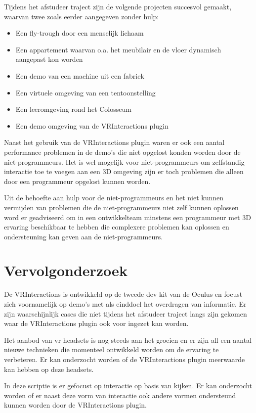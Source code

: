 Tijdens het afstudeer traject zijn de volgende projecten succesvol gemaakt, waarvan twee zoals eerder aangegeven zonder hulp:
\begin{itemize}
	\item Een fly-trough door een menselijk lichaam
	\item Een appartement waarvan o.a. het meubilair en de vloer dynamisch aangepast kon worden
	\item Een demo van een machine uit een fabriek
	\item Een virtuele omgeving van een tentoonstelling
	\item Een leeromgeving rond het Colosseum
	\item Een demo omgeving van de VRInteractions plugin
\end{itemize}

Naast het gebruik van de VRInteractions plugin waren er ook een aantal performance problemen in de demo's die niet opgelost konden worden door de niet-programmeurs. Het is wel mogelijk voor niet-programmeurs om zelfstandig interactie toe te voegen aan een 3D omgeving zijn er toch problemen die alleen door een programmeur opgelost kunnen worden.

Uit de behoefte aan hulp voor de niet-programmeurs en het niet kunnen vermijden van problemen die de niet-programmeurs niet zelf kunnen oplossen word er geadviseerd om in een ontwikkelteam minstens een programmeur met 3D ervaring beschikbaar te hebben die complexere problemen kan oplossen en ondersteuning kan geven aan de niet-programmeurs.

\section{Vervolgonderzoek}
De VRInteractions is ontwikkeld op de tweede dev kit van de Oculus en focust zich voornamelijk op demo's met als einddoel het overdragen van informatie. Er zijn waarschijnlijk cases die niet tijdens het afstudeer traject langs zijn gekomen waar de VRInteractions plugin ook voor ingezet kan worden.

Het aanbod van \gls{vr} headsets is nog steeds aan het groeien en er zijn all een aantal nieuwe technieken die momenteel ontwikkeld worden om de ervaring te verbeteren. Er kan onderzocht worden of de VRInteractions plugin meerwaarde kan hebben op deze headsets.

In deze scriptie is er gefocust op interactie op basis van kijken. Er kan onderzocht worden of er naast deze vorm van interactie ook andere vormen ondersteund kunnen worden door de VRInteractions plugin.